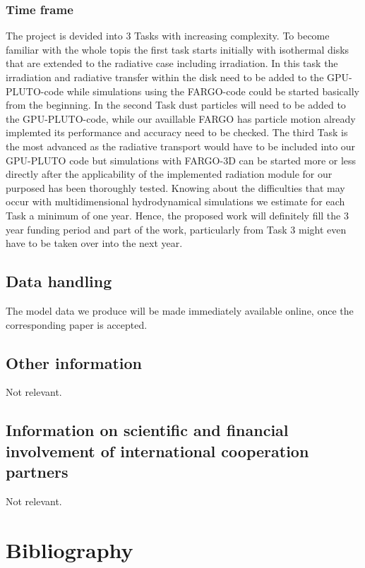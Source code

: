 \documentclass[10pt,fleqn,twoside]{article}
\begin{document}
\subsubsection{Time frame}
The project is devided into 3 Tasks with increasing complexity. To become
familiar with the whole topis the first task starts initially with isothermal disks that are extended 
to the radiative case including irradiation. In this task the irradiation and radiative transfer within the disk
need to be added to the GPU-PLUTO-code while simulations using the FARGO-code could be started basically 
from the beginning. In the second Task dust particles will need to be added to the GPU-PLUTO-code,
while our availlable FARGO has particle motion already implemted its performance and accuracy need to be
checked. The third Task is the most advanced as the radiative transport would have to be included into
our GPU-PLUTO code but simulations with FARGO-3D can be started more or less directly after the 
applicability of the implemented radiation module for our purposed has been thoroughly tested.
Knowing about the difficulties that may occur with multidimensional hydrodynamical simulations we estimate
for each Task a minimum of one year. Hence, the proposed work will definitely fill the 3 year funding period
and part of the work, particularly from Task 3 might even have to be taken over into the next year.



\subsection{Data handling}
The model data we produce will be made immediately available online, once
the corresponding paper is accepted. 

\subsection{Other information}
Not relevant.

\subsection{Information on scientific and financial involvement of international cooperation partners}
Not relevant.

\section{Bibliography}
\end{document}
